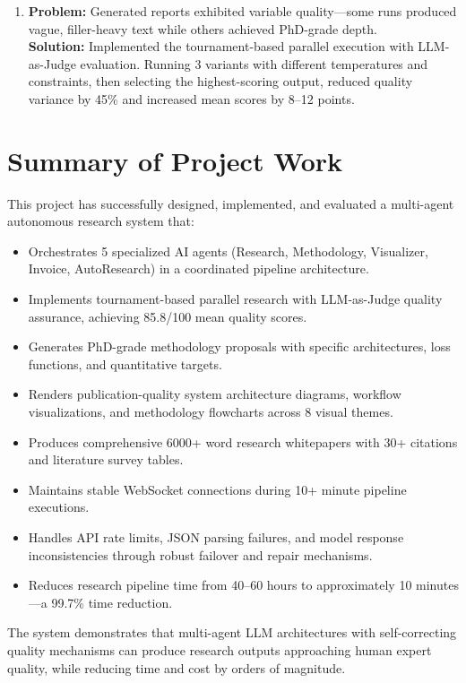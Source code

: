 \documentclass[a4paper,12pt,openany]{report}
\begin{document}
\begin{enumerate}[label=\arabic*., leftmargin=2cm]
\item \textbf{Problem:} Generated reports exhibited variable quality---some runs produced vague, filler-heavy text while others achieved PhD-grade depth.\\
\textbf{Solution:} Implemented the tournament-based parallel execution with LLM-as-Judge evaluation. Running 3 variants with different temperatures and constraints, then selecting the highest-scoring output, reduced quality variance by 45\% and increased mean scores by 8--12 points.
\end{enumerate}

\section{Summary of Project Work}

This project has successfully designed, implemented, and evaluated a multi-agent autonomous research system that:

\begin{itemize}[leftmargin=2cm]
\item Orchestrates 5 specialized AI agents (Research, Methodology, Visualizer, Invoice, AutoResearch) in a coordinated pipeline architecture.
\item Implements tournament-based parallel research with LLM-as-Judge quality assurance, achieving 85.8/100 mean quality scores.
\item Generates PhD-grade methodology proposals with specific architectures, loss functions, and quantitative targets.
\item Renders publication-quality system architecture diagrams, workflow visualizations, and methodology flowcharts across 8 visual themes.
\item Produces comprehensive 6000+ word research whitepapers with 30+ citations and literature survey tables.
\item Maintains stable WebSocket connections during 10+ minute pipeline executions.
\item Handles API rate limits, JSON parsing failures, and model response inconsistencies through robust failover and repair mechanisms.
\item Reduces research pipeline time from 40--60 hours to approximately 10 minutes---a 99.7\% time reduction.
\end{itemize}

The system demonstrates that multi-agent LLM architectures with self-correcting quality mechanisms can produce research outputs approaching human expert quality, while reducing time and cost by orders of magnitude.
\end{document}
